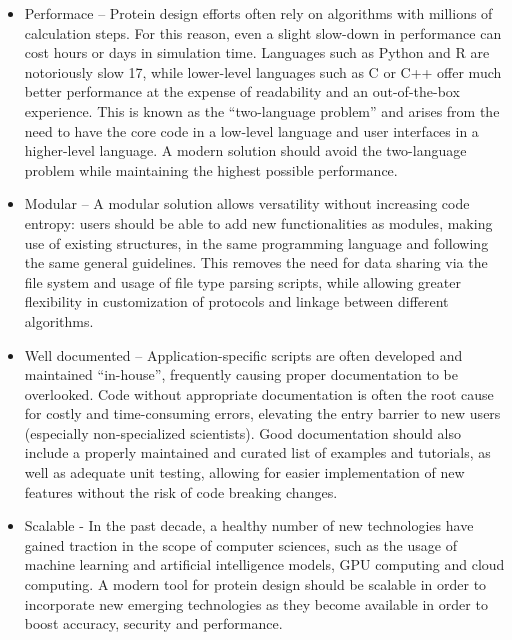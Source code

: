 \documentclass{juliacon}
\begin{document}
\begin{itemize}
\item Performace – Protein design efforts often rely on algorithms with millions of calculation steps. For this reason, even a slight slow-down in performance can cost hours or days in simulation time. Languages such as Python and R are notoriously slow 17, while lower-level languages such as C or C++ offer much better performance at the expense of readability and an out-of-the-box experience. This is known as the “two-language problem” and arises from the need to have the core code in a low-level language and user interfaces in a higher-level language. A modern solution should avoid the two-language problem while maintaining the highest possible performance.\vspace{5mm}

\item Modular – A modular solution allows versatility without increasing code entropy: users should be able to add new functionalities as modules, making use of existing structures, in the same programming language and following the same general guidelines. This removes the need for data sharing via the file system and usage of file type parsing scripts, while allowing greater flexibility in customization of protocols and linkage between different algorithms.\vspace{5mm}

\item Well documented – Application-specific scripts are often developed and maintained “in-house”, frequently causing proper documentation to be overlooked. Code without appropriate documentation is often the root cause for costly and time-consuming errors, elevating the entry barrier to new users (especially non-specialized scientists). Good documentation should also include a properly maintained and curated list of examples and tutorials, as well as adequate unit testing, allowing for easier implementation of new features without the risk of code breaking changes.\vspace{5mm}

\item Scalable - In the past decade, a healthy number of new technologies have gained traction in the scope of computer sciences, such as the usage of machine learning and artificial intelligence models, GPU computing and cloud computing. A modern tool for protein design should be scalable in order to incorporate new emerging technologies as they become available in order to boost accuracy, security and performance.
\end{itemize}\vspace{5mm}
\end{document}
